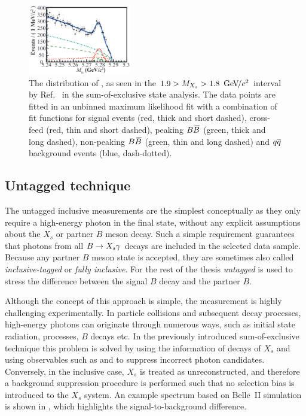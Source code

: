 \begin{figure}[htbp!]
    \centering
    \includegraphics[width=0.4\textwidth]{figures/experiment_overview/Mbc_sum_exclusive_Belle.png}
    \caption{\label{fig:mbc_sum_of_exclusive} 
    The distribution of \Mbc, as seen in the $1.9>M_{X_s}>1.8~{\mathrm{\,Ge\kern -0.1em V\!/}c^2}$ interval by Ref.~\cite{Belle:2014nmp} in the sum-of-exclusive state analysis.
    The data points are fitted in an unbinned maximum likelihood fit with a combination of fit functions for 
    signal events (red, thick and short dashed), 
    cross-feed (red, thin and short dashed), 
    peaking $B\kern 0.18em\overline{\kern -0.18em B}{}$ (green, thick and long dashed), 
    non-peaking $B\kern 0.18em\overline{\kern -0.18em B}{}$ (green, thin and long dashed)
    and $q\overline q$ background events (blue, dash-dotted).
    }
\end{figure}

\subsection{Untagged technique}\label{sec:untagged}
The untagged inclusive measurements are the simplest conceptually as they only require a high-energy photon in the final state, without any explicit assumptions about the $X_s$ or partner $B$ meson decay.
Such a simple requirement guarantees that photons from all $\BtoXsgamma$ decays are included in the selected data sample.
Because any partner $B$ meson state is accepted, they are sometimes also called \textit{inclusive-tagged} or \textit{fully inclusive}.
For the rest of the thesis \textit{untagged} is used to stress the difference between the signal $B$ decay and the partner $B$.

Although the concept of this approach is simple, the measurement is highly challenging experimentally.
In particle collisions and subsequent decay processes, high-energy photons can originate through numerous ways, such as initial \epem state radiation, \epem\ra\qqbar processes, $B$ decays etc.
In the previously introduced sum-of-exclusive technique this problem is solved by using the information of decays of $X_s$ and using observables such as \Mbc and \DeltaE to suppress incorrect photon candidates. 
Conversely, in the inclusive case, $X_s$ is treated as unreconstructed, and therefore a background suppression procedure is performed such that no selection bias is introduced to the $X_s$ system.
An example spectrum based on Belle~II simulation is shown in , which highlights the signal-to-background difference.

